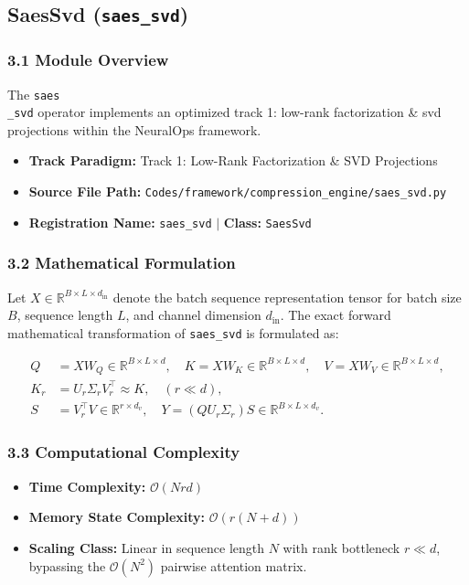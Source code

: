 \subsection{SaesSvd (\texttt{saes\_svd})}
\label{sec:app_module_saes_svd}

\subsubsection*{3.1 Module Overview}
The \texttt{saes\\_svd} operator implements an optimized track 1: low-rank factorization \& svd projections within the NeuralOps framework.
\begin{itemize}
    \item \textbf{Track Paradigm:} Track 1: Low-Rank Factorization & SVD Projections
    \item \textbf{Source File Path:} \texttt{Codes/framework/compression\_engine/saes\_svd.py}
    \item \textbf{Registration Name:} \texttt{saes\_svd} $\mid$ \textbf{Class:} \texttt{SaesSvd}
\end{itemize}

\subsubsection*{3.2 Mathematical Formulation}
Let $X \in \mathbb{R}^{B \times L \times d_{\text{in}}}$ denote the batch sequence representation tensor for batch size $B$, sequence length $L$, and channel dimension $d_{\text{in}}$. The exact forward mathematical transformation of \texttt{saes\_svd} is formulated as:

\begin{align}
Q &= X W_Q \in \mathbb{R}^{B \times L \times d}, \quad K = X W_K \in \mathbb{R}^{B \times L \times d}, \quad V = X W_V \in \mathbb{R}^{B \times L \times d}, \\
K_r &= U_r \Sigma_r V_r^\top \approx K, \quad (r \ll d), \\
S &= V_r^\top V \in \mathbb{R}^{r \times d_v}, \quad Y = (Q U_r \Sigma_r) S \in \mathbb{R}^{B \times L \times d_v}.
\end{align}


\subsubsection*{3.3 Computational Complexity}
\begin{itemize}
    \item \textbf{Time Complexity:} $\mathcal{O}(N r d)$
    \item \textbf{Memory State Complexity:} $\mathcal{O}(r(N + d))$
    \item \textbf{Scaling Class:} Linear in sequence length $N$ with rank bottleneck $r \ll d$, bypassing the $\mathcal{O}(N^2)$ pairwise attention matrix.
\end{itemize}

